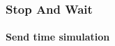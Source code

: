 \begin{frame}		
	\frametitle{Stop And Wait}
	\framesubtitle{Send time simulation}
	
	\begin{columns}
		\begin{column}{0.5\textwidth}  %
			\begin{center}
				\begin{figure}[H]
				\end{figure}
			\end{center}
			\centering 
		\end{column}
		\begin{column}{0.5\textwidth}  %
			\begin{center}
				\begin{figure}[H]
				\end{figure}
			\end{center}
			\centering 
		\end{column}
	\end{columns}
	
	
\end{frame}